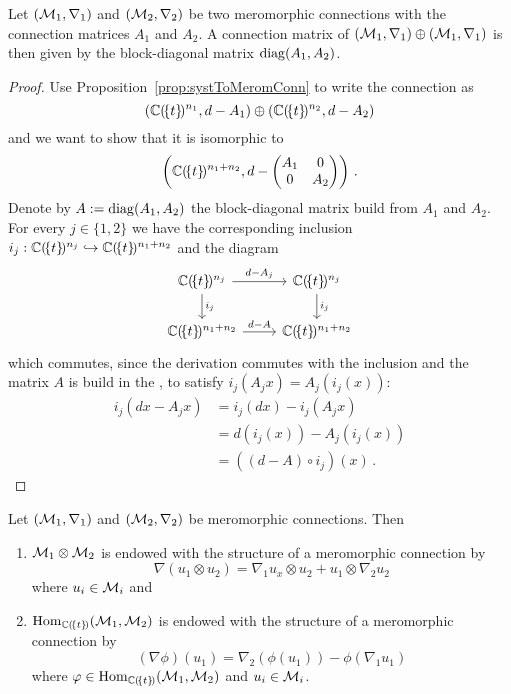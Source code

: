 \begin{prop}
  Let $(\mathcal{M}_1,\nabla_1)$ and $(\mathcal{M}_2,\nabla_2)$ be two meromorphic
  connections
  with the connection matrices $A_1$ and $A_2$.
  A connection matrix of $(\mathcal{M}_1,\nabla_1)\oplus(\mathcal{M}_1,\nabla_1)$ is then
  given
  by the block-diagonal matrix $\operatorname{diag}(A_1,A_2)$.
\end{prop}
\begin{proof}
  Use Proposition~\ref{prop:systToMeromConn} to write the connection as
  \[
    (\mathbb{C}(\!\{t\}\!)^{n_1},d-A_1)\oplus(\mathbb{C}(\!\{t\}\!)^{n_2},d-A_2)
  \]
  and we want to show that it is isomorphic to
  \[
    \left(\mathbb{C}(\!\{t\}\!)^{n_1+n_2},d-
    \begin{pmatrix} A_1 & 0 \\0 & A_2 \end{pmatrix}\right) \,.
  \]
  Denote by $A:=\operatorname{diag}(A_1,A_2)$ the block-diagonal matrix build from $A_1$ and
  $A_2$.
  For every $j\in\{1,2\}$ we have the corresponding inclusion
  $i_j:\mathbb{C}(\!\{t\}\!)^{n_j}\hookrightarrow\mathbb{C}(\!\{t\}\!)^{n_1+n_2}$ and the
  diagram
  \[ \begin{tikzcd}
      \C(\!\{t\}\!)^{n_j} \rar{d-A_j}\dar{i_j} & \C(\!\{t\}\!)^{n_j} \dar{i_j}
    \\\C(\!\{t\}\!)^{n_1+n_2} \rar{d-A} & \C(\!\{t\}\!)^{n_1+n_2}
  \end{tikzcd} \]
  which commutes, since the derivation commutes with the inclusion and the
  matrix $A$ is build in the , to satisfy
  $i_j(A_jx)=A_j(i_j(x))$:
  \begin{align*}
    i_j(dx-A_jx) &= i_j(dx)-i_j(A_jx)
    \\&=d(i_j(x))-A_j(i_j(x))
    \\&=((d-A)\circ i_j)(x) \,.
  \end{align*}
\end{proof}

\begin{rem}
  Let $(\mathcal{M}_1,\nabla_1)$ and $(\mathcal{M}_2,\nabla_2)$ be meromorphic connections.
  Then
  \begin{enumerate}
    \item $\mathcal{M}_1\otimes\mathcal{M}_2$ is endowed with the structure of a meromorphic
      connection by
      \[
        \nabla(u_1\otimes u_2)=\nabla_1u_x\otimes u_2+u_1\otimes\nabla_2u_2
      \]
      where $u_i\in\mathcal{M}_i$ and
    \item $\operatorname{Hom}_{\mathbb{C}(\!\{t\}\!)}(\mathcal{M}_1,\mathcal{M}_2)$ is endowed with the structure of
      a meromorphic
      connection by
      \[
        (\nabla\phi)(u_1)=\nabla_2(\phi(u_1))-\phi(\nabla_1 u_1)
      \]
      where $\varphi\in\operatorname{Hom}_{\mathbb{C}(\!\{t\}\!)}(\mathcal{M}_1,\mathcal{M}_2)$ and $u_i\in\mathcal{M}_i$.
  \end{enumerate}
\end{rem}

